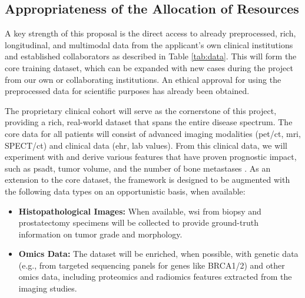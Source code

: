 \documentclass[11pt, a4paper]{article}
\begin{document}
\subsection{Appropriateness of the Allocation of Resources}
A key strength of this proposal is the direct access to already preprocessed, rich, longitudinal, and multimodal data from the applicant's own clinical institutions and established collaborators as described in Table \ref{tab:data}. This will form the core training dataset, which can be expanded with new cases during the project from our own or collaborating institutions. An ethical approval for using the preprocessed data for scientific purposes has already been obtained.

The proprietary clinical cohort will serve as the cornerstone of this project, providing a rich, real-world dataset that spans the entire disease spectrum. The core data for all patients will consist of advanced imaging modalities (\gls{pet}/\gls{ct}, \gls{mri}, SPECT/\gls{ct}) and clinical data (\gls{ehr}, lab values). From this clinical data, we will experiment with and derive various features that have proven prognostic impact, such as \gls{psadt}, tumor volume, and the number of bone metastases \cite{guidelines_uro_1,guidelines_uro_2}. As an extension to the core dataset, the framework is designed to be augmented with the following data types on an opportunistic basis, when available:

\begin{itemize}
    \item \textbf{Histopathological Images:} When available, \gls{wsi} from biopsy and prostatectomy specimens will be collected to provide ground-truth information on tumor grade and morphology.
    \item \textbf{Omics Data:} The dataset will be enriched, when possible, with genetic data (e.g., from targeted sequencing panels for genes like BRCA1/2) and other omics data, including proteomics and radiomics features extracted from the imaging studies.
\end{itemize}
\end{document}
